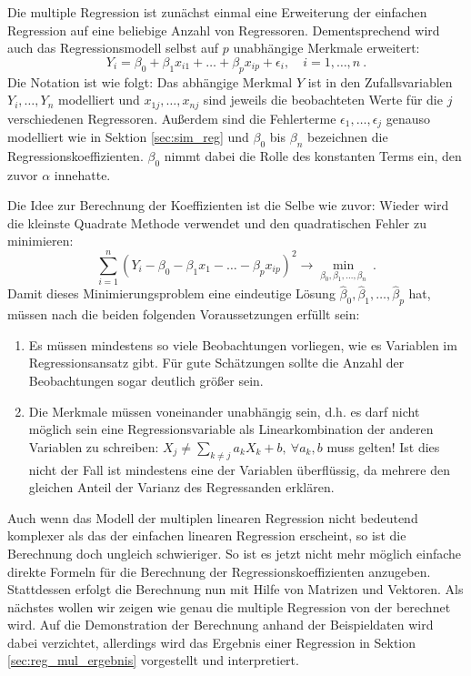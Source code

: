 Die multiple Regression ist zunächst einmal eine Erweiterung der einfachen Regression auf eine beliebige Anzahl von Regressoren.
Dementsprechend wird auch das Regressionsmodell selbst auf $p$ unabhängige Merkmale erweitert:
\begin{equation*}
  Y_i = \beta_0 + \beta_1 x_{i1} + \dots + \beta_p x_{ip} + \epsilon_i, \quad i = 1, \dots, n ~.
\end{equation*}
Die Notation ist wie folgt:
Das abhängige Merkmal $Y$ ist in den Zufallsvariablen $Y_i, \dots, Y_n$ modelliert und $x_{1j}, \dots, x_{nj}$ sind jeweils die beobachteten Werte für die $j$ verschiedenen Regressoren.
Außerdem sind die Fehlerterme $\epsilon_1, \dots, \epsilon_j$ genauso modelliert wie in Sektion \ref{sec:sim_reg} und $\beta_0$ bis $\beta_n$ bezeichnen die Regressionskoeffizienten.
$\beta_0$ nimmt dabei die Rolle des konstanten Terms ein, den zuvor $\alpha$ innehatte.

Die Idee zur Berechnung der Koeffizienten ist die Selbe wie zuvor:
Wieder wird die kleinste Quadrate Methode verwendet und den quadratischen Fehler zu minimieren:
\begin{equation*}
  \label{eq:kq_mul}
  \sum\limits_{i=1}^{n} (Y_i - \beta_0 -\beta_1 x_1 - \dots - \beta_p x_{ip})^2 \rightarrow \min\limits_{\beta_0,\beta_1,\dots,\beta_n} ~.
\end{equation*}
Damit dieses Minimierungsproblem eine eindeutige Lösung $\hat\beta_0, \hat\beta_1, \dots, \hat\beta_p$ hat, müssen nach \citep[S.496]{Fahrmeir2010} die beiden folgenden Voraussetzungen erfüllt sein:
\begin{enumerate}
  \item Es müssen mindestens so viele Beobachtungen vorliegen, wie es Variablen im Regressionsansatz gibt. 
    Für gute Schätzungen sollte die Anzahl der Beobachtungen sogar deutlich größer sein.
  \item Die Merkmale müssen voneinander unabhängig sein, d.h. es darf nicht möglich sein eine Regressionsvariable als Linearkombination der anderen Variablen zu schreiben: $X_j \neq \sum\limits_{k\neq j} a_k X_k + b,~ \forall a_k, b$ muss gelten!
    Ist dies nicht der Fall ist mindestens eine der Variablen überflüssig, da mehrere den gleichen Anteil der Varianz des Regressanden erklären.  
\end{enumerate}

Auch wenn das Modell der multiplen linearen Regression nicht bedeutend komplexer als das der einfachen linearen Regression erscheint, so ist die Berechnung doch ungleich schwieriger.
So ist es jetzt nicht mehr möglich einfache direkte Formeln für die Berechnung der Regressionskoeffizienten anzugeben.
Stattdessen erfolgt die Berechnung nun mit Hilfe von Matrizen und Vektoren.
Als nächstes wollen wir zeigen wie genau die multiple Regression von der \naglib berechnet wird.
Auf die Demonstration der Berechnung anhand der Beispieldaten wird dabei verzichtet, allerdings wird das Ergebnis einer Regression in Sektion \ref{sec:reg_mul_ergebnis} vorgestellt und interpretiert.

